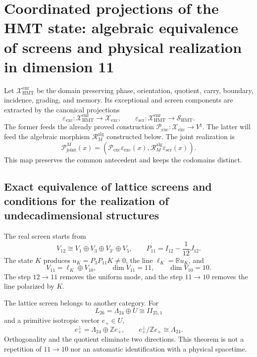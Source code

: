 \section{Coordinated projections of the HMT state: algebraic equivalence of screens and physical realization in dimension 11}
\label{sec:cierre-equivalencias-moonshine-teoria-m-20260825}

Let \(\mathcal X_{\mathrm{HMT}}^{\mathrm{enr}}\) be the domain preserving
phase, orientation, quotient, carry, boundary, incidence, grading, and
memory. Its exceptional and screen components are extracted by the
canonical projections
\[
 \varepsilon_{\mathrm{exc}}:
 \mathcal X_{\mathrm{HMT}}^{\mathrm{enr}}
 \longrightarrow\mathscr X_{\mathrm{exc}},
 \qquad
 \varepsilon_{\mathrm{scr}}:
 \mathcal X_{\mathrm{HMT}}^{\mathrm{enr}}
 \longrightarrow\mathscr S_{\mathrm{HMT}}.
\]
The former feeds the already proved construction
\(\mathcal P_{\mathrm{exc}}:\mathscr X_{\mathrm{exc}}\to V^\natural\).
The latter will feed the algebraic morphism
\(\mathcal R_M^{\mathrm{alg}}\) constructed below. The joint realization
is
\[
 \mathcal P_{\mathrm{joint}}^M(x)
 =\left(
   \mathcal P_{\mathrm{exc}}\varepsilon_{\mathrm{exc}}(x),
   \mathcal R_M^{\mathrm{alg}}\varepsilon_{\mathrm{scr}}(x)
  \right).
\]
This map preserves the common antecedent and keeps the codomains distinct.

\subsection{Exact equivalence of lattice screens and conditions for the realization of undecadimensional structures}

The real screen starts from
\[
 V_{12}\cong V_1\oplus V_3\oplus V_{3'}\oplus V_5,
 \qquad
 P_{11}=I_{12}-\frac1{12}J_{12}.
\]
The state \(K\) produces \(u_K=P_3P_{11}K\ne0\), the line
\(\ell_K=\mathbb Ru_K\), and
\[
 V_{11}=\ell_K\oplus V_{10},
 \qquad \dim V_{11}=11,
 \qquad \dim V_{10}=10.
\]
The step \(12\to11\) removes the uniform mode, and the step \(11\to10\) removes
the line polarized by \(K\).

The lattice screen belongs to another category. For
\[
 L_{26}=\Lambda_{24}\oplus U\cong II_{25,1}
\]
and a primitive isotropic vector \(e_+\in U\),
\[
 e_+^\perp=\Lambda_{24}\oplus\mathbb Ze_+,
 \qquad
 \boxed{e_+^\perp/\mathbb Ze_+\cong\Lambda_{24}.}
\]
Orthogonality and the quotient eliminate two directions. This theorem is not
a repetition of \(11\to10\) nor an automatic identification with a
physical spacetime.

